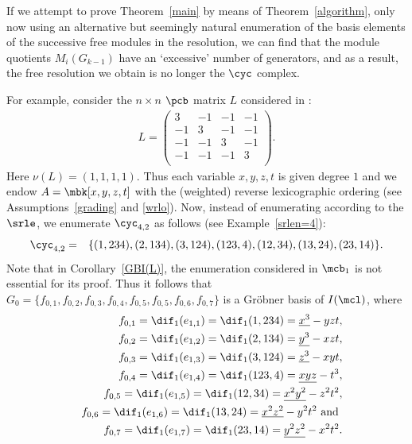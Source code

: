 \begin{remark}\label{nonsrle}
If we attempt to prove Theorem~\ref{main} by means of
Theorem~\ref{algorithm}, only now using an alternative but seemingly
natural enumeration of the basis elements of the successive free
modules in the resolution, we can find that the module quotients
$M_{i}(G_{k-1})$ have an `excessive' number of generators, and as a
result, the free resolution we obtain is no longer the $\cyc$ complex.

For example, consider the $n\times n$ $\pcb$ matrix $L$ considered in
\cite[Example~1, 3]{ms}:
\begin{eqnarray*}
L=\left(\begin{array}{rrrr}
3&-1&-1&-1\\
-1&3&-1&-1\\
-1&-1&3&-1\\
-1&-1&-1&3\\
\end{array}\right).
\end{eqnarray*}
Here $\nu(L)=(1,1,1,1)$. Thus each variable $x,y,z,t$ is given degree
$1$ and we endow $A=\mbk[x,y,z,t]$ with the (weighted) reverse
lexicographic ordering (see Assumptions~\ref{grading} and
\ref{wrlo}). Now, instead of enumerating according to the $\srle$, we
enumerate $\cyc_{4,2}$ as follows (see Example~\ref{srlen=4}):
\begin{eqnarray*}
\cyc_{4,2}&=&\{(1,234),(2,134),(3,124),(123,4),(12,34),(13,24),(23,14)\}.
\end{eqnarray*}
Note that in Corollary~\ref{GBI(L)}, the enumeration considered in
$\mcb_1$ is not essential for its proof. Thus it follows that
$G_0=\{f_{0,1},f_{0,2},f_{0,3},f_{0,4},f_{0,5},f_{0,5},f_{0,6},f_{0,7}\}$
is a Gr\"obner basis of $I(\mcl)$, where
\begin{eqnarray*}
&&f_{0,1}=\dif_1(e_{1,1})=\dif_1(1,234)=\underline{x^3}-yzt,\\
&&f_{0,2}=\dif_1(e_{1,2})=\dif_1(2,134)=\underline{y^3}-xzt,\\
&&f_{0,3}=\dif_1(e_{1,3})=\dif_1(3,124)=\underline{z^3}-xyt,\\ 
&&f_{0,4}=\dif_1(e_{1,4})=\dif_1(123,4)=\underline{xyz}-t^3,\\
&&f_{0,5}=\dif_1(e_{1,5})=\dif_1(12,34)=\underline{x^2y^2}-z^2t^2,\\ 
&&f_{0,6}=\dif_1(e_{1,6})=\dif_1(13,24)=\underline{x^2z^2}-y^2t^2\mbox{ and }\\
&&f_{0,7}=\dif_1(e_{1,7})=\dif_1(23,14)=\underline{y^2z^2}-x^2t^2.
\end{eqnarray*}

\end{remark}
